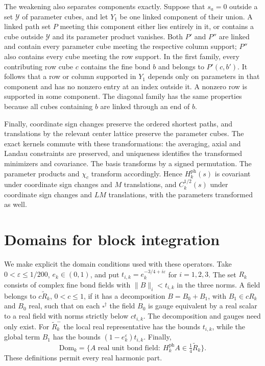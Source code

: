 The weakening also separates components exactly. Suppose that
$s_a=0$ outside a set $\mathscr Y$ of parameter cubes, and let
$Y_1$ be one linked component of their union. A linked path set
$P$ meeting this component either lies entirely in it, or
contains a cube outside $\mathscr Y$ and its parameter product
vanishes. Both $P'$ and $P''$ are linked and contain every
parameter cube meeting the respective column support; $P''$
also contains every cube meeting the row support. In the first
family, every contributing row cube $c$ contains the fine bond
$b$ and belongs to $P'(c,b')$. It follows that a row or column
supported in $Y_1$ depends only on parameters in that component
and has no nonzero entry at an index outside it. A nonzero row
is supported in some component. The diagonal family has the
same properties because all cubes containing $b$ are linked
through an end of $b$.

Finally, coordinate sign changes preserve the ordered shortest
paths, and translations by the relevant center lattice preserve
the parameter cubes. The exact kernels commute with these
transformations: the averaging, axial and Landau constraints
are preserved, and uniqueness identifies the transformed
minimizers and covariance. The basis transforms by a signed
permutation. The parameter products and $\chi_c$ transform
accordingly. Hence $H_k^{\mathrm{ph}}(s)$ is covariant under
coordinate sign changes and $M$ translations, and
$C_k^{1/2}(s)$ under coordinate sign changes and $LM$
translations, with the parameters transformed as well.

\section{Domains for block integration}
\label{subsec:photon-domain-bounds}

We make explicit the domain conditions used with these operators.
Take $0<\varepsilon\le1/200$, $e_k\in(0,1)$, and put
$t_{i,k}=e_k^{-3/4+i\varepsilon}$ for $i=1,2,3$.
The set $R_k$ consists of complex fine bond fields with
$\|B\|_i<t_{i,k}$ in the three norms. A field belongs to
$c\widetilde R_k$, $0<c\le1$, if it has a decomposition
$B=B_0+B_1$, with $B_1\in cR_k$ and $B_0$ real, such that on
each $\square^\dagger$ the field $B_0$ is gauge equivalent by a real scalar
to a real field with norms strictly below $ct_{i,k}$.
The decomposition and gauges need only exist. For
$\widetilde R_k^-$ the local real representative has the bounds
$t_{i,k}$, while the global term $B_1$ has the bounds
$(1-e_k^\varepsilon)t_{i,k}$. Finally,
\[
 \mathrm{Dom}_k=
 \{A\text{ real unit bond field}:\ H_k^{\mathrm{ph}}A
                                      \in\tfrac14\widetilde R_k\}.
\]
These definitions permit every real harmonic part.

